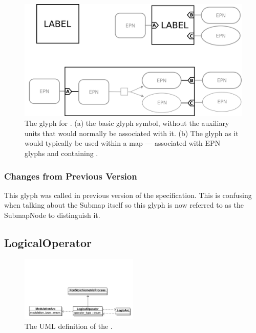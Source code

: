 \begin{figure}[H]
  \centering
  \includegraphics[scale = 0.22]{images/submapglyph}
  \caption{The \PD glyph for . (a) the basic glyph
    symbol, without the  auxiliary units that
    would normally be associated with it. (b) The glyph as it would
    typically be used within a map --- associated with EPN glyphs and
    containing .}
  \label{fig:submap}
\end{figure}

\subsubsection{Changes from Previous Version}

This glyph was called  in previous version of the \PD
specification. This is confusing when talking about the Submap itself
so this glyph is now referred to as the SubmapNode to distinguish it.

\subsection{LogicalOperator}
\label{sec:logic}
\label{defn:LogicalOperator}

\begin{figure}[htb]
  \centering
  \includegraphics[width = 0.5\textwidth]{images/logicaloperatoruml}
  \caption{The UML definition of the .}
  \label{fig:logicaloperatoruml}
\end{figure}

